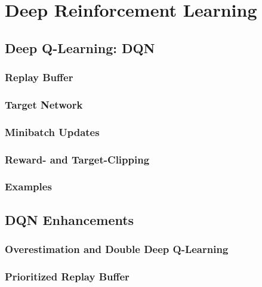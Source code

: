 \chapter{Deep Reinforcement Learning} %

	\section{Deep Q-Learning: \acs{DQN}} %

		\subsection{Replay Buffer} %

		\subsection{Target Network} %

		\subsection{Minibatch Updates} %

		\subsection{Reward- and Target-Clipping} %

		\subsection{Examples} %

	\section{\acs{DQN} Enhancements} %

		\subsection{Overestimation and Double Deep Q-Learning} %

		\subsection{Prioritized Replay Buffer} %


